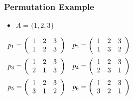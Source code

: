 \documentclass[dvipsnames]{beamer}
\begin{document}
\begin{frame}
  \frametitle{Permutation Example}

  \begin{itemize}
    \item $A = \{1,2,3\}$
  \end{itemize}

  \medskip
  \begin{center}
  $\begin{array}{cc}
    p_1 = \left(
      \begin{array}{ccc}
        1 & 2 & 3\\
        1 & 2 & 3
      \end{array}
    \right) &
    p_2 = \left(
      \begin{array}{ccc}
        1 & 2 & 3\\
        1 & 3 & 2
      \end{array}
    \right)\medskip\\
    p_3 = \left(
      \begin{array}{ccc}
        1 & 2 & 3\\
        2 & 1 & 3
      \end{array}
    \right) &
    p_4 = \left(
      \begin{array}{ccc}
        1 & 2 & 3\\
        2 & 3 & 1
      \end{array}
    \right)\medskip\\
    p_5 = \left(
      \begin{array}{ccc}
        1 & 2 & 3\\
        3 & 1 & 2
      \end{array}
    \right) &
    p_6 = \left(
      \begin{array}{ccc}
        1 & 2 & 3\\
        3 & 2 & 1
      \end{array}
    \right)
  \end{array}$
  \end{center}
\end{frame}
\end{document}
